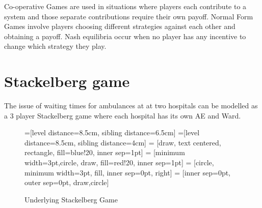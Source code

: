 \documentclass[a0,landscape]{a0poster}
\begin{document}
\begin{multicols}{3}
Co-operative Games are used in situations where players each contribute to a system and those separate contributions require their own payoff.
Normal Form Games involve players choosing different strategies against each other and obtaining a payoff.
Nash equilibria occur when no player has any incentive to change which strategy they play.

\color{Goldenrod}
\section*{Stackelberg game}
The issue of waiting times for ambulances at at two hospitals can be modelled as a 3 player Stackelberg game where each hospital has its own AE and Ward.


{\color{black}
\begin{figure}[H]
    \begin{center}
        =[level distance=8.5cm, sibling distance=6.5cm]
        =[level distance=8.5cm, sibling distance=4cm]
         = [draw, text centered, rectangle, fill=blue!20, inner sep=1pt]
         = [minimum width=3pt,circle,  draw, fill=red!20, inner sep=1pt]
         = [circle, minimum width=3pt, fill, inner sep=0pt, right]
         = [inner sep=0pt, outer sep=0pt, draw,circle]
        \caption{Underlying Stackelberg Game}\label{fig:stackelberg_game}
    \end{center}
\end{figure}
}


\end{multicols}
\end{document}
